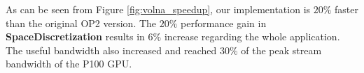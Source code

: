 As can be seen from Figure \ref{fig:volna_speedup}, our implementation is $20\%$
faster than the original OP2 version. The $20\%$ performance gain in 
\textbf{SpaceDiscretization} results in $6\%$ increase regarding the whole 
application. The useful bandwidth also increased and reached $30\%$ of the peak 
stream bandwidth of the P100 GPU.

